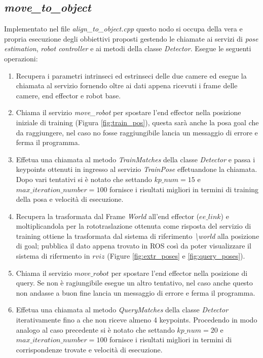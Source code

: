 \documentclass[english]{article}
\begin{document}
\newpage

\subsection{\textit{move\_to\_object}}
Implementato nel file \textit{align\_to\_object.cpp} questo nodo si occupa della vera e propria esecuzione degli obbiettivi proposti gestendo le chiamate ai servizi di \textit{pose estimation}, \textit{robot controller} e ai metodi della classe \textit{Detector}. Esegue le seguenti operazioni:
\begin{enumerate}
\item Recupera i parametri intrinseci ed estrinseci delle due camere ed esegue la chiamata al servizio  fornendo oltre ai dati appena ricevuti i frame delle camere, end effector e robot base.
\item Chiama il servizio \textit{move\_robot} per spostare l'end effector nella posizione iniziale di training (Figura \ref{fig:train_pos}), questa sarà anche la posa goal che da raggiungere, nel caso no fosse raggiungibile lancia un messaggio di errore e ferma il programma.
\item Effetua una chiamata al metodo \textit{TrainMatches} della classe \textit{Detector} e passa i keypoints ottenuti in ingresso al servizio \textit{TrainPose} effetuandone la chiamata. Dopo vari tentativi si è notato che settando $kp\_num = 15$ e $max\_iteration\_number = 100$ fornisce i risultati migliori in termini di training della posa e velocità di esecuzione.
\item Recupera la trasformata dal Frame \textit{World} all'end effector (\textit{$ee\_link$}) e moltiplicandola per la rototraslazione ottenuta come risposta del servizio di training ottiene la trasformata dal sistema di riferimento \textit{\textbackslash world} alla posizione di goal; pubblica il dato appena trovato in ROS così da poter visualizzare il sistema di rifermento in $rviz$ (Figure \ref{fig:extr_poses} e \ref{fig:query_poses}).
\item Chiama il servizio $move\_robot$ per spostare l'end effector nella posizione di query. Se non è ragiungibile esegue un altro tentativo, nel caso anche questo non andasse a buon fine lancia un messaggio di errore e ferma il programma.
\item Effetua una chiamata al metodo \textit{QueryMatches} della classe \textit{Detector} iterativamente fino a che non riceve almeno 4 keypoints. Procedendo in modo analogo al caso precedente si è notato che settando $kp\_num = 20$ e $max\_iteration\_number = 100$ fornisce i risultati migliori in termini di corrispondenze trovate e velocità di esecuzione.

\end{enumerate}
\end{document}
